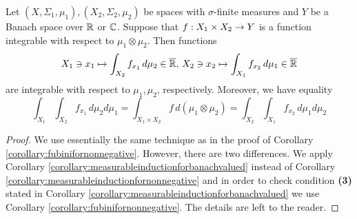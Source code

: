 \begin{corollary}\label{corollary:fubiniforintegrable}
Let $(X,\Sigma_1,\mu_1), (X_2,\Sigma_2,\mu_2)$ be spaces with $\sigma$-finite measures and $Y$ be a Banach space over ${\mathbb R}$ or ${\mathbb C}$. Suppose that $f:X_1\times X_2\rightarrow Y$ is a function integrable with respect to $\mu_1\otimes \mu_2$. Then functions
$$X_1\ni x_1\mapsto \int_{X_2}f_{x_1}\,d\mu_2\in \overline{{\mathbb R}},\,X_2\ni x_2\mapsto \int_{X_1}f_{x_2}\,d\mu_1\in \overline{{\mathbb R}}$$
are integrable with respect to $\mu_1, \mu_2$, respectively. Moreover, we have equality
$$\int_{X_1}\int_{X_2}f_{x_1}\,d\mu_2d\mu_1 = \int_{X_1\times X_2}f\,d(\mu_1\otimes \mu_2) = \int_{X_2}\int_{X_1}f_{x_2}\,d\mu_1d\mu_2 $$
\end{corollary}
\begin{proof}
We use essentially the same technique as in the proof of Corollary \ref{corollary:fubinifornonnegative}. However, there are two differences. We apply Corollary \ref{corollary:measurableinductionforbanachvalued} instead of Corollary \ref{corollary:measurableinductionfornonnegative} and in order to check condition \textbf{(3)} stated in Corollary \ref{corollary:measurableinductionforbanachvalued} we use Corollary \ref{corollary:fubinifornonnegative}. The details are left to the reader.
\end{proof}




\small




